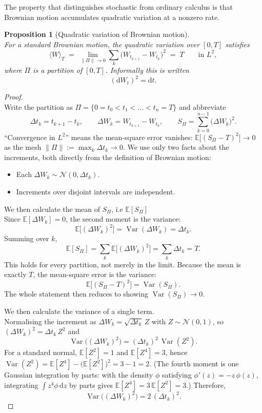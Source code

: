 \documentclass[11pt]{report}
\newcommand{\E}{\mathbb{E}}
\newcommand{\Var}{\operatorname{Var}}
\newcommand{\dd}{\mathrm{d}}
\newcommand{\dW}{\dd W_t}
\newcommand{\dt}{\dd t}
\theoremstyle{plain}
\newtheorem{proposition}{Proposition}[chapter]
\theoremstyle{definition}
\theoremstyle{remark}
\numberwithin{equation}{chapter}
\begin{document}
The property that distinguishes stochastic from ordinary calculus is
that Brownian motion accumulates quadratic variation at a
nonzero rate.

\begin{proposition}[Quadratic variation of Brownian motion]\label{prop:qv}
\leavevmode\\
       For a standard Brownian motion, the quadratic variation over $[0,T]$
satisfies
\[
   \langle W\rangle_T \;=\; \lim_{\|\Pi\|\to 0}\sum_{k} \big(W_{t_{k+1}}-W_{t_k}\big)^2
        \;=\; T
   \qquad \text{in } L^2,
\]
where $\Pi$ is a partition of $[0,T]$. Informally this is written
\[
   (\dW)^2 = \dt.
\]
\end{proposition}

\begin{proof}
       \leavevmode\\
Write the partition as $\Pi=\{0=t_0<t_1<\dots<t_n=T\}$ and abbreviate
\[
  \Delta t_k = t_{k+1}-t_k, \qquad
  \Delta W_k = W_{t_{k+1}}-W_{t_k}, \qquad
  S_\Pi = \sum_{k=0}^{n-1}\big(\Delta W_k\big)^2 .
\]
``Convergence in $L^2$'' means the mean-square error vanishes:
$\E\big[(S_\Pi-T)^2\big]\to0$ as the mesh $\|\Pi\|:=\max_k\Delta t_k\to0$.
We use only two facts about the increments, both directly from the definition
of Brownian motion:
\begin{itemize}
  \item Each $\Delta W_k\sim\mathcal N(0,\Delta t_k)$.
  \item Increments over disjoint intervals are independent.
\end{itemize}
\medskip
\noindent We then calculate the mean of $S_\Pi$, i.e $\E[S_\Pi]$
\\
Since $\E[\Delta W_k]=0$, the second moment is the variance:
\[
  \E\big[(\Delta W_k)^2\big]=\Var(\Delta W_k)=\Delta t_k .
\]
Summing over $k$,
\[
  \E[S_\Pi]=\sum_{k}\E\big[(\Delta W_k)^2\big]
           =\sum_k \Delta t_k = T .
\]
This holds for every partition, not merely in the limit. Because the
mean is exactly $T$, the mean-square error is the variance:
\[
  \E\big[(S_\Pi-T)^2\big]=\Var(S_\Pi) .
\]
The whole statement then reduces to showing $\Var(S_\Pi)\to0$.

\medskip
\noindent We then calculate the variance of a single term.
\\
Normalising the increment as $\Delta W_k=\sqrt{\Delta t_k}\,Z$ with
$Z\sim\mathcal N(0,1)$, so $(\Delta W_k)^2=\Delta t_k\,Z^2$ and
\[
  \Var\big((\Delta W_k)^2\big)=(\Delta t_k)^2\,\Var(Z^2).
\]
For a standard normal, $\E[Z^2]=1$ and $\E[Z^4]=3$, hence
$\Var(Z^2)=\E[Z^4]-\big(\E[Z^2]\big)^2=3-1=2$. (The fourth moment is one
Gaussian integration by parts: with the density $\phi$ satisfying
$\phi'(z)=-z\,\phi(z)$, integrating $\int z^4\phi\,\dd z$ by parts gives
$\E[Z^4]=3\,\E[Z^2]=3$.) Therefore,
\[
  \Var\big((\Delta W_k)^2\big)=2\,(\Delta t_k)^2 .
\]


\end{proof}
\end{document}
